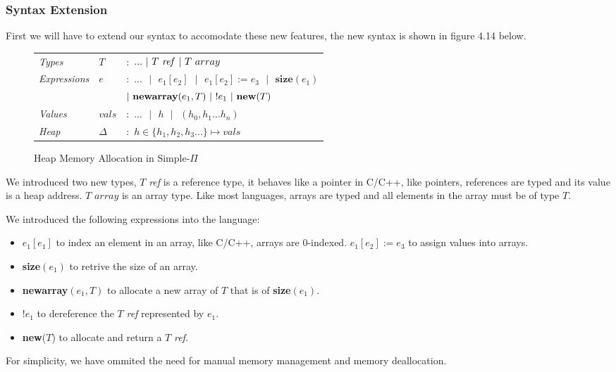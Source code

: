 \documentclass[a4paper,12pt]{report}
\begin{document}
\subsubsection{Syntax Extension}
First we will have to extend our syntax to accomodate these new features, the 
new syntax is shown in figure 4.14 below.

\begin{figure}[H]
  \begin{center}
    \begin{tabular} {l l l}
      \textit{Types} & $T$& $:$ $...\text{ }|\text{ }T\text{ \textit{ref }}|\text{ } T \text{ }array$ \\
      \textit{Expressions} & $e$& $:$ $...\text{ }|\text{ }e_1[e_2]\text{ }
        |\text{ }e_1[e_2] := e_3\text{ }|\text{ }\textbf{size}(e_1)$ \\
        & & \; $|\text{ }\textbf{newarray}(e_1, T)\text{ }|\text{ }!e_1\text{ }|\text{ \textbf{new}}(T)$ \\
     \textit{Values} & $vals$& $:$ $...\text{ }|\text{ }h\text{ }|\text{ }(h_0,h_1...h_n)$ \\
     \textit{Heap} & $\Delta$& $:$ $h \in \{h_1,h_2, h_3...\} \mapsto vals$\\
    \end{tabular}
  \end{center}
  \caption{Heap Memory Allocation in Simple-$\Pi$}
\end{figure}


\par
We introduced two new types, $T$ \textit{ref} is a reference type, it behaves 
like a pointer in C/C++, like pointers, references are typed and its value is a heap address. 
$T$ $array$ is an array type. Like most languages, arrays are typed 
and all elements in the array must be of type $T$.

\par
We introduced the following expressions into the language:
\begin{itemize}
  \item $e_1[e_1]$ to index an element in an array, like C/C++, arrays are 
  0-indexed. $e_1[e_2] := e_3$ to assign values into arrays.
  \item \textbf{size}$(e_1)$ to retrive the size of an array.
  \item \textbf{newarray}$(e_1, T)$ to allocate a new array of $T$ that is of 
  \textbf{size}$(e_1)$.
  \item $!e_1$ to dereference the $T$ \textit{ref} represented by $e_1$.
  \item \textbf{new}($T$) to allocate and return a $T$ \textit{ref}.
\end{itemize}
\par
For simplicity, we have ommited the need for manual memory management and memory 
deallocation.
\end{document}
